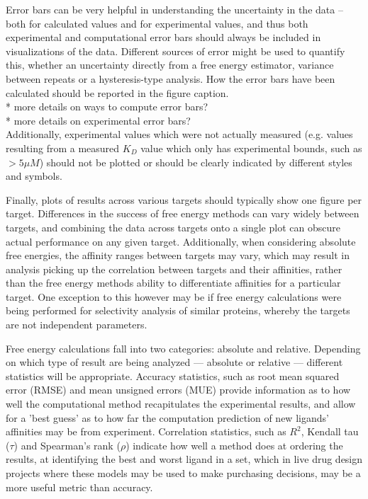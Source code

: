 \documentclass[9pt,bestpractices]{livecoms}
\begin{document}
Error bars can be very helpful in understanding the uncertainty in the data -- both for calculated values and for experimental values, and thus both experimental and computational error bars should always be included in visualizations of the data. Different sources of error might be used to quantify this, whether an uncertainty directly from a free energy estimator, variance between repeats or a hysteresis-type analysis. How the error bars have been calculated should be reported in the figure caption.\\
* more details on ways to compute error bars?\\
* more details on experimental error bars?\\
Additionally, experimental values which were not actually measured (e.g. values resulting from a measured $K_D$ value which only has experimental bounds, such as $> 5 \mu M$) should not be plotted or should be clearly indicated by different styles and symbols.

Finally, plots of results across various targets should typically show one figure per target. Differences in the success of free energy methods can vary widely between targets, and combining the data across targets onto a single plot can obscure actual performance on any given target. Additionally, when considering absolute free energies, the affinity ranges between targets may vary, which may result in analysis picking up the correlation between targets and their affinities, rather than the free energy methods ability to differentiate affinities for a particular target. One exception to this however may be if free energy calculations were being performed for selectivity analysis of similar proteins, whereby the targets are not independent parameters.

\label{sec:statistical_analysis}
Free energy calculations fall into two categories: absolute and relative. Depending on which type of result are being analyzed --- absolute or relative --- different statistics will be appropriate. Accuracy statistics, such as root mean squared error (RMSE) and mean unsigned errors (MUE) provide information as to how well the computational method recapitulates the experimental results, and allow for a 'best guess' as to how far the computation prediction of new ligands' affinities may be from experiment. Correlation statistics, such as $R^{2}$, Kendall tau ($\tau$) and Spearman's rank ($\rho$) indicate how well a method does at ordering the results, at identifying the best and worst ligand in a set, which in live drug design projects where these models may be used to make purchasing decisions, may be a more useful metric than accuracy.\\
\end{document}
